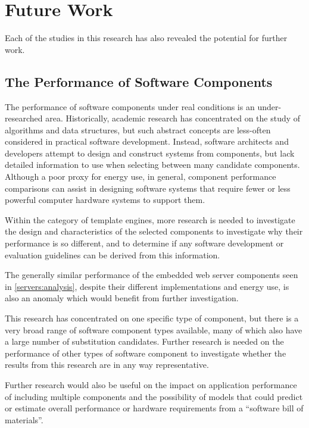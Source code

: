 \section{Future Work}
\label{section:future work}

Each of the studies in this research has also revealed the potential for further work.

\subsection{The Performance of Software Components}

The performance of software components under real conditions is an under-researched area. Historically, academic research has concentrated on the study of algorithms and data structures, but such abstract concepts are less-often considered in practical software development. Instead, software architects and developers attempt to design and construct systems from components, but lack detailed information to use when selecting between many candidate components. Although a poor proxy for energy use, in general, component performance comparisons can assist in designing software systems that require fewer or less powerful computer hardware systems to support them.

Within the category of \gls{template engine}s, more research is needed to investigate the design and characteristics of the selected components to investigate why their performance is so different, and to determine if any software development or evaluation guidelines can be derived from this information.

The generally similar performance of the embedded web server components seen in \autoref{servers:analysis}, despite their different implementations and energy use, is also an anomaly which would benefit from further investigation.

This research has concentrated on one specific type of component, but there is a very broad range of software component types available, many of which also have a large number of substitution candidates. Further research is needed on the performance of other types of software component to investigate whether the results from this research are in any way representative.

Further research would also be useful on the impact on application performance of including multiple components and the possibility of models that could predict or estimate overall performance or hardware requirements from a \enquote{software bill of materials}.

